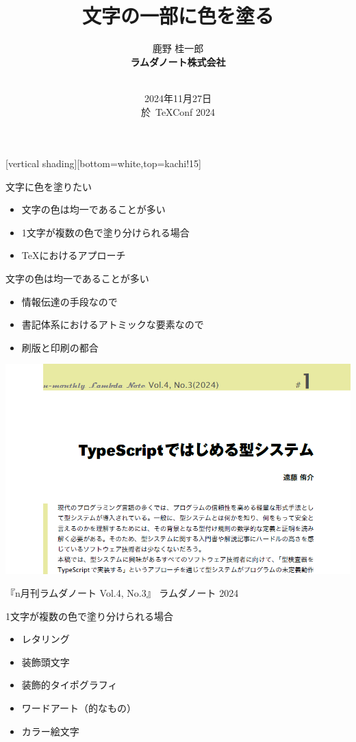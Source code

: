 \documentclass[unicode,14pt]{beamer}
\title{文字の一部に色を塗る}
\author{\sffamily 鹿野 桂一郎\\
\bfseries ラムダノート株式会社\\
\small\bfseries \email{k16.shikano@lambdanote.com} \\ 
\twitter{golden\_lucky} 
}
\date{\sffamily\footnotesize 2024年11月27日\\ 於\, TeXConf 2024}
\begin{document}
\frame{\titlepage}

[vertical shading][bottom=white,top=kachi!15]

\begin{frame}[t]{\inhibitglue 文字に色を塗りたい}
  \sffamily
  \begin{itemize}
    \item 文字の色は均一であることが多い
    \item 1文字が複数の色で塗り分けられる場合
    \item TeXにおけるアプローチ
  \end{itemize}
  \vfill
\end{frame}

\begin{frame}[t]{文字の色は均一であることが多い}
  \sffamily
  \begin{itemize}
    \item 情報伝達の手段なので
    \item 書記体系におけるアトミックな要素なので
    \item 刷版と印刷の都合
  \end{itemize}
  \begin{center}
    \includegraphics[width=.50\textwidth]{figures/nlambda.png}
  \end{center}
\raggedleft\tiny\color{50gray} 『n月刊ラムダノート Vol.4, No.3』 ラムダノート 2024
\end{frame}

\begin{frame}[t]{1文字が複数の色で塗り分けられる場合}
  \sffamily
  \begin{itemize}
\item レタリング
\item 装飾頭文字
\item 装飾的タイポグラフィ
\item ワードアート（的なもの）
\item カラー絵文字
  \end{itemize}
\end{frame}
\end{document}
